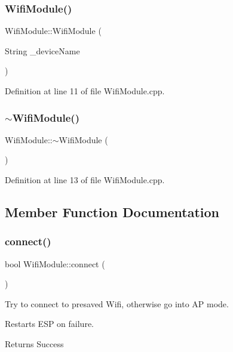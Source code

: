 \subsubsection{\texorpdfstring{WifiModule()}{WifiModule()}}
{\footnotesize\ttfamily Wifi\+Module\+::\+Wifi\+Module (\begin{DoxyParamCaption}\item[{String}]{\+\_\+device\+Name }\end{DoxyParamCaption})}



Definition at line 11 of file Wifi\+Module.\+cpp.

\mbox{\label{class_wifi_module_a13508027d6d44f9ad4adc916a142c4e4}} 
\subsubsection{\texorpdfstring{$\sim$WifiModule()}{~WifiModule()}}
{\footnotesize\ttfamily Wifi\+Module\+::$\sim$\+Wifi\+Module (\begin{DoxyParamCaption}{ }\end{DoxyParamCaption})}



Definition at line 13 of file Wifi\+Module.\+cpp.



\subsection{Member Function Documentation}
\mbox{\label{class_wifi_module_a408a6374602360051d2791de4f56b067}} 
\subsubsection{\texorpdfstring{connect()}{connect()}}
{\footnotesize\ttfamily bool Wifi\+Module\+::connect (\begin{DoxyParamCaption}{ }\end{DoxyParamCaption})}



Try to connect to presaved Wifi, otherwise go into AP mode. 

Restarts E\+SP on failure. \begin{DoxyReturn}{Returns}
Success 
\end{DoxyReturn}


